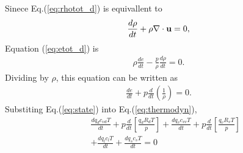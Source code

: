 Sinece Eq.(\ref{eq:rhotot_d}) is equivallent to
\begin{eqnarray}
  \frac{d \rho}{dt}+\rho \nabla \cdot {\bf u} = 0,
\end{eqnarray}
Equation (\ref{eq:etot_d}) is
\begin{eqnarray}
  \rho \frac{de}{dt} - \frac{p}{\rho}\frac{d \rho}{dt} =0. \label{eq:etot_d2}
\end{eqnarray}
Dividing by $\rho$, this equation can be written as
\begin{eqnarray}
  \frac{de}{dt} + p \frac{d}{dt}\left(\frac{1}{\rho}\right) = 0.
\label{eq:thermodyn}
\end{eqnarray}
Substiting Eq.(\ref{eq:state}) into Eq.(\ref{eq:thermodyn}),
\begin{eqnarray}
&& \frac{d  q_d c_{vd}   T}{dt} + p \frac{d}{dt} \left[\frac{q_d R_d T}{p}\right]
+\frac{d  q_v c_{vv}   T}{dt} + p \frac{d}{dt} \left[\frac{q_v R_v T}{p}\right]
\nonumber\\
&&+\frac{d  q_l c_{l}   T}{dt}+\frac{d  q_s c_{s}   T}{dt} =0 
\label{eq:thermodyn_dash}
\end{eqnarray}

